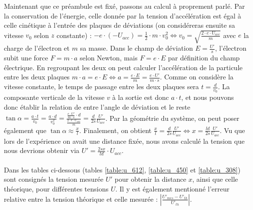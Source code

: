 \documentclass[11pt]{article}
\begin{document}
Maintenant que ce préambule est fixé, passons au calcul à proprement parlé. Par la conservation de l'énergie, celle donnée par la tension d'accélération est égal à celle cinétique à l'entrée des plaques de déviations (on considéreras ensuite sa vitesse $v_0$ selon $z$ constante) : $-e \cdot (-U_{acc}) = \frac{1}{2} \cdot m \cdot v_0^2 \Leftrightarrow v_0 = \sqrt{\frac{2 \cdot e \cdot U_{acc}}{m}}$ avec $e$ la charge de l'électron et $m$ sa masse. Dans le champ de déviation $E = \frac{U'}{s}$, l'électron subit une force $F=m \cdot a$ selon Newton, mais $F=e \cdot E$ par définition du champ électrique. En regroupant les deux on peut calculer l'accélération de la particule entre les deux plaques $m \cdot a = e \cdot E \Leftrightarrow a = \frac{e \cdot E}{m} = \frac{e \cdot U'}{m \cdot s}$. Comme on considère la vitesse constante, le temps de passage entre les deux plaques sera $t = \frac{d}{v_0}$. La composante verticale de la vitesse $v$ à la sortie est donc $a \cdot t$, et nous pouvons donc établir la relation de entre l'angle de déviation et le reste $\tan \alpha = \frac{a \cdot t}{v_0} = \frac{a \cdot d}{v_0^2} = \frac{\frac{e \cdot U'}{m \cdot s}\cdot d}{\frac{2 \cdot e \cdot U_{acc}}{m}} = \frac{d}{2s}\frac{U'}{U_{acc}}$. Par la géométrie du système, on peut poser également que $\tan \alpha \approx \frac{x}{l}$. Finalement, on obtient $\frac{x}{l} = \frac{d}{2s}\frac{U'}{U_{acc}} \Leftrightarrow x = \frac{ld}{2s}\frac{U'}{U_{acc}}$. Vu que lors de l'expérience on avait une distance fixée, nous avons calculé la tension que nous devrions obtenir via $U' = \frac{2sx}{ld}\cdot U_{acc}$.\\ \\
Dans les tables ci-dessous (tables \ref{table:u_612}, \ref{table:u_450} et \ref{table:u_308}) sont consignés la tension mesurée $U'$ pour obtenir la distance $x$, ainsi que celle théorique, pour différentes tensions $U$. Il y est également mentionné l'erreur relative entre la tension théorique et celle mesurée : $|\frac{U'_{mes}-U'_{th}}{U'_{th}}|$.
\end{document}
